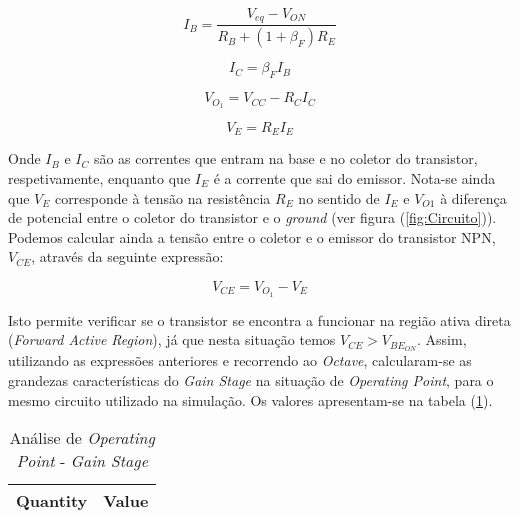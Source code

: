 \begin{equation}
  \label{eq:IB}
  I_B = \frac{V_{eq} - V_{ON}}{R_B + (1 + \beta_F) R_E}
\end{equation}

\begin{equation}
  \label{eq:IC}
  I_C = \beta_F I_B
\end{equation}

\begin{equation}
  \label{eq:VO}
  V_{O_1} = V_{CC} - R_C I_C 
\end{equation}

\begin{equation}
  \label{eq:VE}
  V_E = R_E I_E
\end{equation}

Onde $I_B$ e $I_C$ são as correntes que entram na base e no coletor do transistor, respetivamente, enquanto que $I_E$ é a corrente
que sai do emissor. Nota-se ainda que $V_E$ corresponde à tensão na resistência $R_E$ no sentido de $I_E$ e $V_{O1}$ à diferença de potencial
entre o coletor do transistor e o \emph{ground} (ver figura (\ref{fig:Circuito})).
\\
Podemos calcular ainda a tensão entre o coletor e o emissor do transistor NPN, $V_{CE}$, através da seguinte expressão:

\begin{equation}
  \label{eq:VCE}
  V_{CE} = V_{O_1} - V_E 
\end{equation}

Isto permite verificar se o transistor se encontra a funcionar na região ativa direta (\emph{Forward Active Region}),
já que nesta situação temos $V_{CE} > V_{BE_{ON}}$. Assim, utilizando as expressões anteriores e recorrendo ao
\emph{Octave}, calcularam-se as grandezas características do \emph{Gain Stage} na situação de \emph{Operating Point},
para o mesmo circuito utilizado na simulação. Os valores apresentam-se na tabela (\ref{tab:Teo-OP-GainStage}).

\begin{table}[H]
    \centering
    \begin{tabular}{|l|r|}
    \hline    
    {\bf Quantity} & {\bf Value} \\ \hline
    
    \end{tabular}
    \caption{Análise de \emph{Operating Point} - \emph{Gain Stage}}
    \label{tab:Teo-OP-GainStage}
\end{table} 

